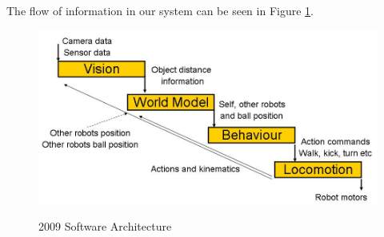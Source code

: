 The flow of information in our system can be seen in Figure
\ref{fig:software}. 

\begin{figure}[!h]
\begin{center}
    \scalebox{0.5} {\includegraphics{figs/software.jpg} }
    \caption{2009 Software Architecture}
    \label{fig:software}
\end{center}
\end{figure}

